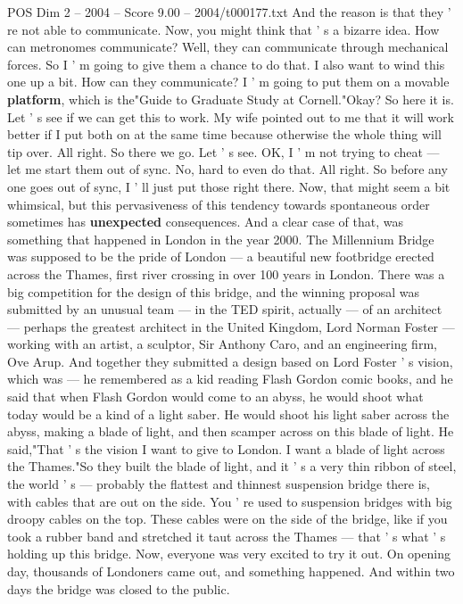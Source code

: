 \begin{textsample}{POS Dim 2 – 2004 – Score 9.00 – 2004/t000177.txt}
And the reason is that they ' re not able to communicate.
Now, you might think that ' s a bizarre idea.
How can metronomes communicate?
Well, they can communicate through mechanical forces.
So I ' m going to give them a chance to do that.
I also want to wind this one up a bit.
How can they communicate?
I ' m going to put them on a movable \textbf{platform}, which is the"Guide to Graduate Study at Cornell."Okay?
So here it is.
Let ' s see if we can get this to work.
My wife pointed out to me that it will work better if I put both on at the same time because otherwise the whole thing will tip over.
All right.
So there we go.
Let ' s see.
OK, I ' m not trying to cheat — let me start them out of sync.
No, hard to even do that.
All right.
So before any one goes out of sync, I ' ll just put those right there.
Now, that might seem a bit whimsical, but this pervasiveness of this tendency towards spontaneous order sometimes has \textbf{unexpected} consequences.
And a clear case of that, was something that happened in London in the year 2000.
The Millennium Bridge was supposed to be the pride of London — a beautiful new footbridge erected across the Thames, first river crossing in over 100 years in London.
There was a big competition for the design of this bridge, and the winning proposal was submitted by an unusual team — in the TED spirit, actually — of an architect — perhaps the greatest architect in the United Kingdom, Lord Norman Foster — working with an artist, a sculptor, Sir Anthony Caro, and an engineering firm, Ove Arup.
And together they submitted a design based on Lord Foster ' s vision, which was — he remembered as a kid reading Flash Gordon comic books, and he said that when Flash Gordon would come to an abyss, he would shoot what today would be a kind of a light saber.
He would shoot his light saber across the abyss, making a blade of light, and then scamper across on this blade of light.
He said,"That ' s the vision I want to give to London.
I want a blade of light across the Thames."So they built the blade of light, and it ' s a very thin ribbon of steel, the world ' s — probably the flattest and thinnest suspension bridge there is, with cables that are out on the side.
You ' re used to suspension bridges with big droopy cables on the top.
These cables were on the side of the bridge, like if you took a rubber band and stretched it taut across the Thames — that ' s what ' s holding up this bridge.
Now, everyone was very excited to try it out.
On opening day, thousands of Londoners came out, and something happened.
And within two days the bridge was closed to the public.

\end{textsample}
